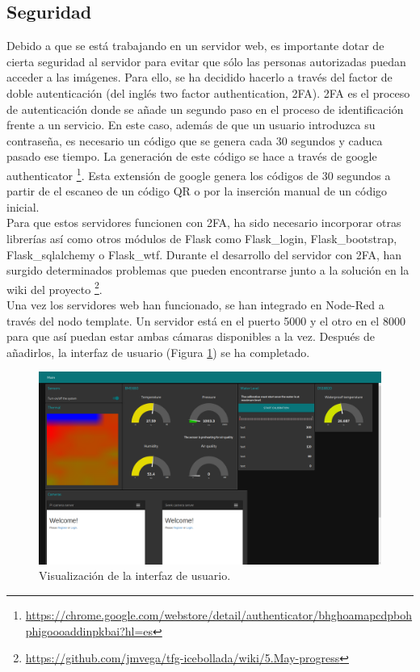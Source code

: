 \subsection{Seguridad}
Debido a que se está trabajando en un servidor web, es importante dotar de cierta seguridad al servidor para evitar que sólo las personas autorizadas puedan acceder a las imágenes. Para ello, se ha decidido hacerlo a través del factor de doble autenticación (del inglés two factor authentication, 2FA). 2FA es el proceso de autenticación donde se añade un segundo paso en el proceso de identificación frente a un servicio. En este caso, además de que un usuario introduzca su contraseña, es necesario un código que se genera cada 30 segundos y caduca pasado ese tiempo. La generación de este código se hace a través de google authenticator \footnote{\url{https://chrome.google.com/webstore/detail/authenticator/bhghoamapcdpbohphigoooaddinpkbai?hl=es}}. Esta extensión de google genera los códigos de 30 segundos a partir de el escaneo de un código QR o por la inserción manual de un código inicial.\\

Para que estos servidores funcionen con 2FA, ha sido necesario incorporar otras librerías así como otros módulos de Flask como Flask\_login, Flask\_bootstrap, Flask\_sqlalchemy o Flask\_wtf. Durante el desarrollo del servidor con 2FA, han surgido determinados problemas que pueden encontrarse junto a la solución en la wiki del proyecto \footnote{\url{https://github.com/jmvega/tfg-icebollada/wiki/5.May-progress}}.\\

Una vez los servidores web han funcionado, se han integrado en Node-Red a través del nodo template. Un servidor está en el puerto 5000 y el otro en el 8000 para que así puedan estar ambas cámaras disponibles a la vez. Después de añadirlos, la interfaz de usuario (Figura \ref{fig:UIcompleta}) se ha completado.\\
\begin{figure} [h!]
  \begin{center}
    \includegraphics[width=16cm]{figs/UIcompleta}
  \end{center}
  \caption{Visualización de la interfaz de usuario.}
  \label{fig:UIcompleta}
\end{figure}

